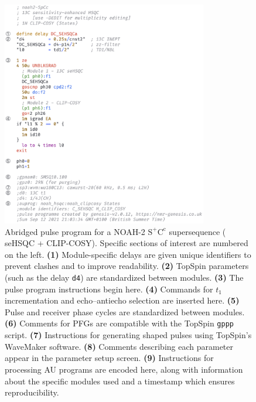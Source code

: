 \documentclass[a4paper,11pt]{article}
\newcommand{\carbon}{\ch{^{13}C}}
\begin{document}
\begin{refsection}
\begin{figure}
    \centering
    \includegraphics[width=0.8\textwidth]{pulprog_code.png}
    \caption{
        Abridged pulse program for a NOAH-2 \(\mathrm{S^+C^c}\) supersequence (\carbon{} seHSQC + CLIP-COSY).
        Specific sections of interest are numbered on the left.
        \textbf{(1)} Module-specific delays are given unique identifiers to prevent clashes and to improve readability.
        \textbf{(2)} TopSpin parameters (such as the delay \texttt{d4}) are standardized between modules.
        \textbf{(3)} The pulse program instructions begin here.
        \textbf{(4)} Commands for \(t_1\) incrementation and echo--antiecho selection are inserted here.
        \textbf{(5)} Pulse and receiver phase cycles are standardized between modules.
        \textbf{(6)} Comments for PFGs are compatible with the TopSpin \texttt{gppp} script.
        \textbf{(7)} Instructions for generating shaped pulses using TopSpin's WaveMaker software.
        \textbf{(8)} Comments describing each parameter appear in the parameter setup screen.
        \textbf{(9)} Instructions for processing AU programs are encoded here, along with information about the specific modules used and a timestamp which ensures reproducibility.
    }
    \label{fig:pulprog_code}
\end{figure}


\end{refsection}
\end{document}
